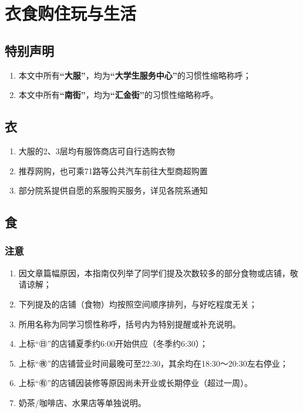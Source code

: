 \chapter[衣食购住玩与生活]{衣食购住玩与生活}

\section*{特别声明}
\begin{enumerate}
    \item 本文中所有\textbf{“大服”}，均为\textbf{“大学生服务中心”}的习惯性缩略称呼；
    \item 本文中所有\textbf{“南街”}，均为\textbf{“汇金街”}的习惯性缩略称呼。
\end{enumerate}
\section[衣]{衣}
\begin{enumerate}
    \item 大服的2、3层均有服饰商店可自行选购衣物
    \item 推荐网购，也可乘71路等公共汽车前往大型商超购置
    \item 部分院系提供自愿的系服购买服务，详见各院系通知
\end{enumerate}

\section[食]{食}
\subsection*{注意}
\begin{enumerate}
    \item 因文章篇幅原因，本指南仅列举了同学们提及次数较多的部分食物或店铺，敬请谅解；
    \item 下列提及的店铺（食物）均按照空间顺序排列，与好吃程度无关；
    \item 所用名称为同学习惯性称呼，括号内为特别提醒或补充说明。
    \item 上标“㊐”的店铺夏季约6:00开始供应（冬季约6:30）；
    \item 上标“㊰”的店铺营业时间最晚可至22:30，其余均在18:30～20:30左右停业；
    \item 上标“㊒”的店铺因装修等原因尚未开业或长期停业（超过一周）。
    \item 奶茶/咖啡店、水果店等单独说明。
\end{enumerate}

